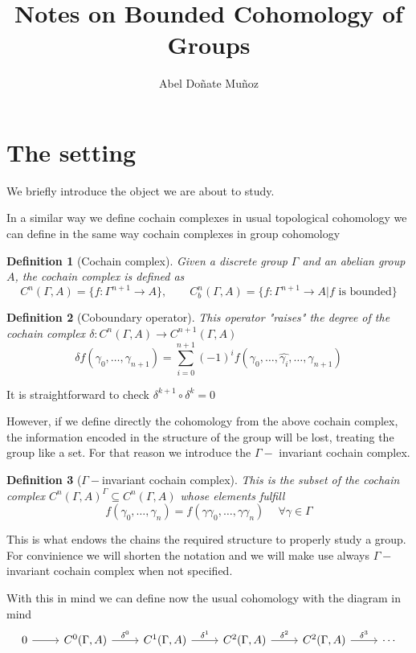 \documentclass[leqno]{article}
\title{Notes on Bounded Cohomology of Groups}
\author{Abel Doñate Muñoz}
\date{}
\newtheorem*{definition}{Definition}
\begin{document}
\maketitle
\tableofcontents
\newpage

\section{The setting}
We briefly introduce the object we are about to study.

In a similar way we define cochain complexes in usual topological cohomology we can define in the same way cochain complexes in group cohomology

\begin{definition}[Cochain complex] Given a discrete group $\Gamma $ and an abelian group $A$, the cochain complex is defined as
\[
  C^n(\Gamma , A) = \{f: \Gamma ^{n+1}\to A\} , \qquad C^n_{b} (\Gamma , A) = \{f:\Gamma ^{n+1}\to  A | f \text{ is bounded}\}
\] 
\end{definition}

\begin{definition}[Coboundary operator] This operator "raises" the degree of the cochain complex $\delta: C^n(\Gamma , A)\to  C^{n+1}(\Gamma , A)$
\[
  \delta f(\gamma_0,\ldots, \gamma_{n+1}) = \sum_{i=0}^{n+1} (-1)^{i}f(\gamma_0, \ldots, \hat{\gamma_i}, \ldots, \gamma_{n+1})
\] 
\end{definition}

It is straightforward to check $\delta^{k+1} \circ \delta^k = 0$

However, if we define directly the cohomology from the above cochain complex, the information encoded in the structure of the group will be lost, treating the group like a set. For that reason we introduce the $\Gamma -$ invariant cochain complex.

\begin{definition}[$\Gamma -$invariant cochain complex] This is the subset of the cochain complex $C^n(\Gamma , A)^\Gamma \subseteq C^n(\Gamma , A)$ whose elements fulfill
  \[
  f(\gamma_0,\ldots, \gamma_n) = f(\gamma\gamma_0,\ldots, \gamma\gamma_n) \quad \ \forall \gamma \in \Gamma 
  \] 
\end{definition}
This is what endows the chains the required structure to properly study a group. For convinience we will shorten the notation and we will make use always $\Gamma -$invariant cochain complex when not specified.

With this in mind we can define now the usual cohomology with the diagram in mind
\[\begin{tikzcd}
	0 & {C^0(\Gamma, A)} & {C^1(\Gamma, A)} & {C^2(\Gamma, A)} & {C^2(\Gamma, A)} & \cdots
	\arrow[from=1-1, to=1-2]
	\arrow["{\delta^0}", from=1-2, to=1-3]
	\arrow["{\delta^1}", from=1-3, to=1-4]
	\arrow["{\delta^2}", from=1-4, to=1-5]
	\arrow["{\delta^3}", from=1-5, to=1-6]
\end{tikzcd}\]
\end{document}
